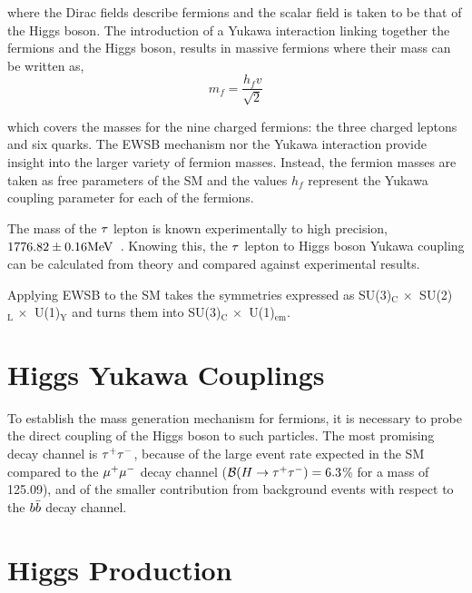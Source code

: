 where the Dirac fields describe fermions and the scalar field is taken to be that of the Higgs boson. 
The introduction of a Yukawa interaction linking together the fermions and the Higgs boson,
results in massive fermions where their mass can be written as,
\begin{equation}
m_{f} = \frac{h_{f} v}{\sqrt{2}}
\label{eqn:yukawa_c}
\end{equation}

which covers the masses for the nine charged fermions: the three charged leptons and six quarks.
The EWSB mechanism nor the Yukawa interaction provide insight into the larger variety of fermion
masses. Instead, the fermion masses are taken as free parameters of the SM and the values
$h_{f}$ represent the Yukawa coupling parameter for each of the fermions.

The mass of the $\tau$ lepton is known experimentally to high precision, $1776.82\pm0.16\mathrm{MeV}$~\cite{PDG}.
Knowing this, the $\tau$ lepton to Higgs boson Yukawa coupling can be calculated from theory
and compared against experimental results.


Applying EWSB to the SM takes the symmetries expressed as 
SU(3)$_{\text{C}} \,\times \,$ SU(2)$_{\text{L}} \,\times \,$ U(1)$_{\text{Y}}$ and turns them into
SU(3)$_{\text{C}} \, \times \,$ U(1)$_{\text{em}}$.








\section{Higgs Yukawa Couplings}
To establish the mass generation mechanism for fermions,
 it is necessary to probe the direct coupling of
the Higgs boson to such particles.
The most promising decay channel is $\tau^+\tau^-$,
because of the large event rate expected in the SM compared to the $\mu^+\mu^-$ decay channel ($\mathcal{B}(H\to\tau^+\tau^-)=6.3$\% for a mass of 125.09\GeV), and of the smaller contribution from background events
with respect to the $b\bar{b}$ decay channel.

\section{Higgs Production}

